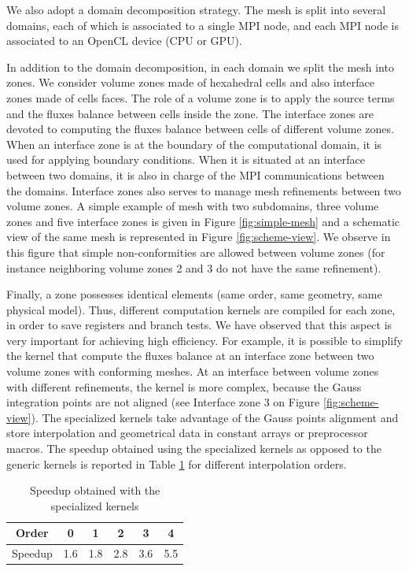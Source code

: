 \documentclass[preprint]{sig-alternate}
\begin{document}
We also adopt a domain decomposition strategy. The mesh is split into
several domains, each of which is associated to a single MPI node, and
each MPI node is associated to an OpenCL device (CPU or GPU).

In addition to the domain decomposition, in each domain we split the mesh into zones. We consider volume zones made of hexahedral cells and also interface zones made of cells faces. The role of a volume zone is to apply the source terms and the fluxes balance between cells inside the zone. The interface zones are devoted to computing the fluxes balance between cells of different volume zones. When an interface zone is at the boundary of the computational domain, it is used for applying boundary conditions. When it is situated at an interface between two domains, it is also in charge of the MPI communications between the domains. Interface zones also serves to manage mesh refinements between two volume zones. A simple example of mesh with two subdomains, three volume zones and five interface zones is given in Figure \ref{fig:simple-mesh} and a schematic view of the same mesh is represented in Figure \ref{fig:scheme-view}. We observe in this figure that simple non-conformities are allowed between volume zones (for instance neighboring volume zones 2 and 3 do not have the same refinement).

Finally, a zone possesses identical elements (same order, same
geometry, same physical model). Thus, different computation kernels are compiled for
each zone, in order to save registers and branch tests. We have observed that this aspect is very important for achieving high efficiency. For example, it is possible to simplify the kernel that compute the fluxes balance at an interface zone between two volume zones with conforming meshes. At an interface between volume zones with different refinements, the kernel is more complex, because the Gauss integration points are not aligned (see Interface zone 3 on Figure \ref{fig:scheme-view}).
 The specialized kernels take advantage of the Gauss points alignment and store interpolation and geometrical data in
constant arrays or preprocessor macros. The speedup obtained using the specialized kernels as opposed to the generic kernels is reported
in Table \ref{tab:speedup_specialisation} for different interpolation orders.

\begin{table}[h]
  \centering
  \begin{tabular}[h]{|c||c|c|c|c|c|}
    \hline
    Order   &   0 &   1 &   2 &   3 &   4 \\ \hline
    Speedup & 1.6 & 1.8 & 2.8 & 3.6 & 5.5 \\ \hline
  \end{tabular}
  \caption{Speedup obtained with the specialized kernels}
  \label{tab:speedup_specialisation}
\end{table}
\end{document}
